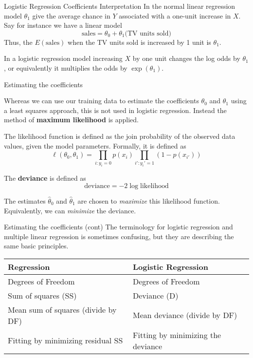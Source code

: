 \documentclass{beamer}
\begin{document}
\begin{frame}{Logistic Regression Coefficients Interpretation}
	In the normal linear regression model $\theta_1$ give the average chance in $Y$ associated with a one-unit increase in $X$.  Say for instance we have a linear model
	\begin{equation*}
		{\textrm{sales}} = {\theta}_0+ {\theta}_1 \textrm{(TV units sold)}
	\end{equation*}
	Thus, the $E(\textrm{sales})$ when the TV units sold is increased by 1 unit is ${\theta}_1$.
	
	In a logistic regression model increasing $X$ by one unit changes the log odds by $\theta_1$, or equivalently it multiplies the odds by $\exp(\theta_1)$. 
	
\end{frame}

\begin{frame}{Estimating the coefficients}
	
	Whereas we can use our training data to estimate the coefficients $\theta_0$ and $\theta_1$ using a least squares approach, this is not used in logistic regression. Instead the method of {\bf maximum likelihood} is applied. 
	
	The likelihood function is defined as the join probability of the observed data values, given the model parameters. Formally, it is defined as
	\begin{equation*}
		\ell (\theta_0,\theta_1)= \prod_{i:y_i=0} p(x_i) \prod_{i':y_i'=1} (1-p(x_{i'}))
	\end{equation*}	

The \textbf{deviance} is defined as 
\begin{equation*}
	\text{deviance}=-2 \log \text{likelihood}
\end{equation*}

The estimates $\hat{\theta}_0$ and $\hat{\theta}_1$  are chosen to {\it maximize} this likelihood function. Equivalently, we can \textit{minimize} the deviance.


\end{frame}		
\begin{frame}{Estimating the coefficients (cont)}
	The terminology for logistic regression and multiple linear regression is sometimes confusing, but they are describing the same basic principles.\\
\setlength{\parskip}{10pt}	
{\small
	\begin{tabular}{|l|l|}
		\hline
		Regression & Logistic Regression \\
		\hline
		Degrees of Freedom & Degrees of Freedom \\
		Sum of squares (SS) & Deviance (D)\\
		Mean sum of squares (divide by DF) & Mean deviance (divide by DF)\\
		Fitting by minimizing residual SS & Fitting by minimizing the deviance\\
		\hline
	\end{tabular}
}
\end{frame}	
\end{document}
